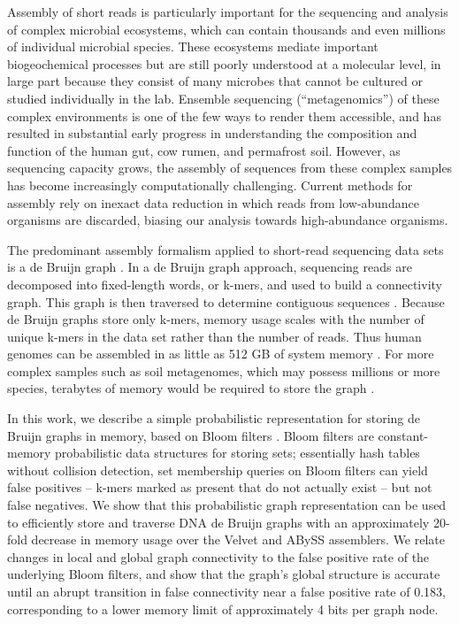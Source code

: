 \documentclass{pnastwo}
\begin{document}
\begin{article}
Assembly of short reads is particularly important for the sequencing
and analysis of complex microbial ecosystems, which can contain
thousands and even millions of individual microbial species.  These
ecosystems mediate important biogeochemical processes but are still
poorly understood at a molecular level, in large part because they
consist of many microbes that cannot be cultured or studied
individually in the lab.  Ensemble sequencing (``metagenomics'') of
these complex environments is one of the few ways to render them
accessible, and has resulted in substantial early progress in
understanding the composition and function of the human gut, cow
rumen, and permafrost soil.  However, as sequencing capacity grows,
the assembly of sequences from these complex samples has become
increasingly computationally challenging.  Current methods for assembly rely on
inexact data reduction in which reads from low-abundance organisms are
discarded, biasing our analysis towards high-abundance organisms.


The predominant assembly formalism applied to short-read sequencing
data sets is a de Bruijn graph \cite{pubmed20211242,pubmed22068540}.
In a de Bruijn graph approach, sequencing reads are decomposed into
fixed-length words, or k-mers, and used to build a connectivity graph.
This graph is then traversed to determine contiguous sequences
\cite{pubmed22068540}.  Because de Bruijn graphs store only k-mers,
memory usage scales with the number of unique k-mers in the data set
rather than the number of reads.  Thus human genomes can be assembled
in as little as 512 GB of system memory \cite{pmid21187386}.  For more
complex samples such as soil metagenomes, which may possess millions
or more species, terabytes of memory would be required to store the graph
\cite{pubmed21304727}.

In this work, we describe a simple probabilistic representation for
storing de Bruijn graphs in memory, based on Bloom filters
\cite{bloom}.  Bloom filters are constant-memory probabilistic data
structures for storing sets; essentially hash tables without collision
detection, set membership queries on Bloom filters can yield false
positives -- k-mers marked as present that do not actually exist --
but not false negatives.  We show that this probabilistic graph
representation can be used to efficiently store and traverse DNA de
Bruijn graphs with an approximately 20-fold decrease in memory usage
over the Velvet\cite{velvet} and ABySS\cite{abyss} assemblers. We relate 
changes in local and
global graph connectivity to the false positive rate of the underlying
Bloom filters, and show that the graph's global structure is accurate
until an abrupt transition in false connectivity near a false positive
rate of 0.183, corresponding to a lower memory limit of approximately
4 bits per graph node.


\end{article}
\end{document}
